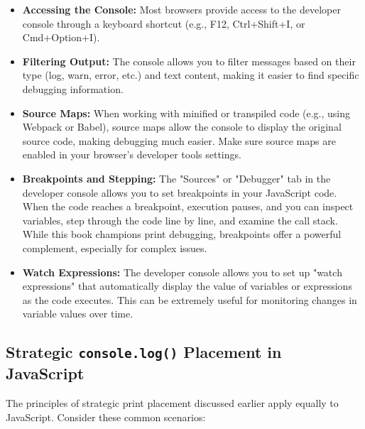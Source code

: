 \documentclass{article}
\begin{document}
{{{{\begin{itemize}
    \item \textbf{Accessing the Console:} Most browsers provide access to the developer console through a keyboard shortcut (e.g., F12, Ctrl+Shift+I, or Cmd+Option+I).
    \item \textbf{Filtering Output:} The console allows you to filter messages based on their type (log, warn, error, etc.) and text content, making it easier to find specific debugging information.
    \item \textbf{Source Maps:} When working with minified or transpiled code (e.g., using Webpack or Babel), source maps allow the console to display the original source code, making debugging much easier. Make sure source maps are enabled in your browser's developer tools settings.
    \item \textbf{Breakpoints and Stepping:} The "Sources" or "Debugger" tab in the developer console allows you to set breakpoints in your JavaScript code. When the code reaches a breakpoint, execution pauses, and you can inspect variables, step through the code line by line, and examine the call stack. While this book champions print debugging, breakpoints offer a powerful complement, especially for complex issues.
    \item \textbf{Watch Expressions:} The developer console allows you to set up "watch expressions" that automatically display the value of variables or expressions as the code executes. This can be extremely useful for monitoring changes in variable values over time.
\end{itemize}

\subsection*{Strategic \texttt{console.log()} Placement in JavaScript}

The principles of strategic print placement discussed earlier apply equally to JavaScript.  Consider these common scenarios:

}}}}
\end{document}

